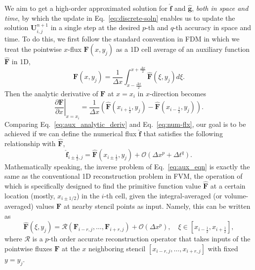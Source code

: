 \documentclass[times,preprint,3p]{elsarticle}
\newcommand{\bff}{\mathbf{f}}
\newcommand{\dt}{\Delta t}
\newcommand{\dx}{\Delta x}
\newcommand{\bF}{\mathbf{F}}
\newcommand{\bU}{\mathbf{U}}
\newcommand{\bg}{\mathbf{g}}
\begin{document}
We aim to get a high-order approximated solution for \( \hat{\bff} \) and \( \hat{\bg} \),
\textit{both in space and time}, by which the update in Eq.~\eqref{eq:discrete-soln}
enables us to update the solution \( \bU^{n+1}_{i,j} \) in a single step
at the desired $p$-th and $q$-th accuracy in space and time.
To do this, we first follow the standard convention in FDM
in which we treat the pointwise $x$-flux $\bF(x,y_j)$ %
as a 1D cell average of
an auxiliary function $\hat{\bF}$ in 1D,
\begin{equation}\label{eq:aux_eqn}
    \bF(x,y_j) = \frac{1}{\Delta x} \int_{x  -{\frac{\dx}{2}}}^{x + {\frac{\dx}{2}}} \hat{\bF}(\xi, y_j) d\xi.
\end{equation}
%
%
Then the analytic derivative of $\bF$ at $x=x_{i}$ in $x$-direction becomes
\begin{equation}\label{eq:aux_analytic_deriv}
    \left. \frac{\partial \bF}{\partial x}\right|_{x=x_{i}} =
    \frac{1}{\dx} \left(\hat{\bF}(x_{i+\frac{1}{2}}, y_j) - \hat{\bF}(x_{i-\frac{1}{2}}, y_j) \right).
\end{equation}
Comparing Eq.~\eqref{eq:aux_analytic_deriv} and Eq.~\eqref{eq:num-flx},
our goal is to be achieved if we can define the numerical flux $\hat {\bff}$ that satisfies
the following relationship with $\hat{\bF}$,
\begin{equation}\label{eq:num-flx-approx}
    \hat{\bff}_{i \pm \frac{1}{2}, j} =
    \hat{\bF} (x_{i \pm \frac{1}{2}}, y_j) + \mathcal{O} (\dx^{p} + \dt^{q}).
\end{equation}
%
Mathematically speaking, the inverse problem of Eq.~\eqref{eq:aux_eqn} is exactly the same as
the conventional 1D reconstruction problem in FVM, the operation of which is specifically designed to
find the primitive function value $\hat{\bF}$ at a certain location (mostly, $x_{i\pm 1/2}$) in the $i$-th cell,
given the integral-averaged (or volume-averaged) values ${\bF}$ at nearby stencil points
as input. Namely, this can be written as
%
\begin{equation}\label{eq:inverse_reconst}
    \hat{\bF}(\xi, y_j) = \mathcal{R}\left(\bF_{i-r, j}, \dots, \bF_{i+r, j}\right) + \mathcal{O} (\dx^p),
    \quad
    \xi \in [x_{i-\frac{1}{2}}, x_{i+\frac{1}{2}}],
\end{equation}
where $\mathcal{R}$ is a $p$-th order accurate reconstruction operator that takes inputs
of the pointwise fluxes $\bF$ at the $x$ neighboring stencil $[x_{i-r,j}, \dots, x_{i+r,j}]$ with fixed $y=y_j$.
\end{document}
